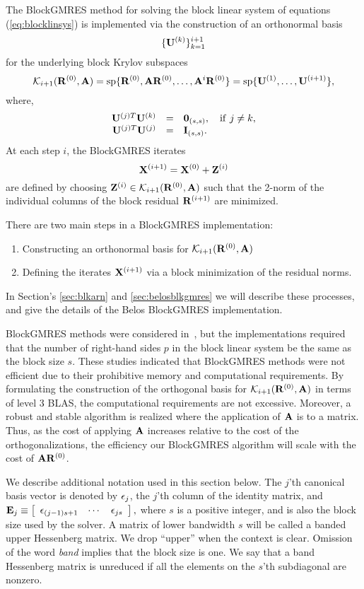 \documentclass{article}
\newcommand{\bA}{{\bf A}}
\newcommand{\bE}{{\bf E}}
\newcommand{\bI}{{\bf I}}
\newcommand{\bR}{{\bf R}}
\newcommand{\bU}{{\bf U}}
\newcommand{\bX}{{\bf X}}
\newcommand{\bZ}{{\bf Z}}
\newcommand{\dm}{\begin{displaymath}}
\newcommand{\edm}{\end{displaymath}}
\begin{document}
The BlockGMRES method for solving the block linear system of
equations (\ref{eq:blocklinsys}) is implemented via the
construction of an orthonormal basis
 \dm
 \{ \bU^{(k)} \}_{k=1}^{i+1}
 \edm
for the underlying block Krylov subspaces
  \dm
 {\cal K}_{i+1}(\bR^{(0)},\bA) = {\rm sp}\{\bR^{(0)},\bA
 \bR^{(0)},\ldots,\bA^{i}\bR^{(0)}\}= {\rm sp}\{ \bU^{(1)},
 \ldots, \bU^{(i+1)} \},
 \edm
where,
 \dm
 \begin{array}{rcl}
 \bU^{(j)T} \bU^{(k)} &=& {\bf 0}_{(s,s)}, \quad {\rm
 if}~j \ne k, \\
 \bU^{(j)T} \bU^{(j)} &=& \bI_{(s,s)}.
 \end{array}
 \edm
At each step $i$, the BlockGMRES iterates
 \dm
 \bX^{(i+1)} = \bX^{(0)} + \bZ^{(i)}
 \edm
are defined by choosing $\bZ^{(i)} \in {\cal K}_{i+1}(\bR^{(0)},
\bA)$ such that the 2-norm of the individual columns of the block
residual $\bR^{(i+1)}$ are minimized.

There are two main steps in a BlockGMRES implementation:
\begin{enumerate}
\item Constructing an orthonormal basis for ${\cal
K}_{i+1}(\bR^{(0)}, \bA)$
\item Defining the iterates $\bX^{(i+1)}$ via a block minimization
of the residual norms.
\end{enumerate}
In Section's \ref{sec:blkarn} and \ref{sec:belosblkgmres} we will
describe these processes, and give the details of the Belos
BlockGMRES implementation.


BlockGMRES methods were considered in~\cite{siga:95,siga:96}, but
the implementations required that the number of right-hand sides
$p$ in the block linear system be the same as the block size $s$.
These studies indicated that BlockGMRES methods were not efficient
due to their prohibitive memory and computational requirements. By
formulating the construction of the orthogonal basis for ${\cal
K}_{i+1}(\bR^{(0)}, \bA)$ in terms of level 3 BLAS, the
computational requirements are not excessive. Moreover, a robust
and stable algorithm is realized where the application of $\bA$ is
to a matrix.  Thus, as the cost of applying $\bA$ increases
relative to the cost of the orthogonalizations, the efficiency our
BlockGMRES algorithm will scale with the cost of $\bA \bR^{(0)}$.

We describe additional notation used in this section below. The
$j$'th canonical basis vector is denoted by ${\bf \epsilon}_j$,
the $j$'th column of the identity matrix, and
 $\bE_j \equiv \left[\begin{array}{ccc}
                    {\bf \epsilon}_{(j-1)s+1} & \cdots & {\bf \epsilon}_{js}
                   \end{array}\right] ,$
where $s$ is a positive integer, and is also the block size used
by the solver. A matrix of lower bandwidth $s$ will be called a
banded upper Hessenberg matrix.  We drop ``upper'' when the
context is clear. Omission of the word {\em band} implies that the
block size is one. We say that a band Hessenberg matrix is
unreduced if all the elements on the $s$'th subdiagonal are
nonzero.
\end{document}
